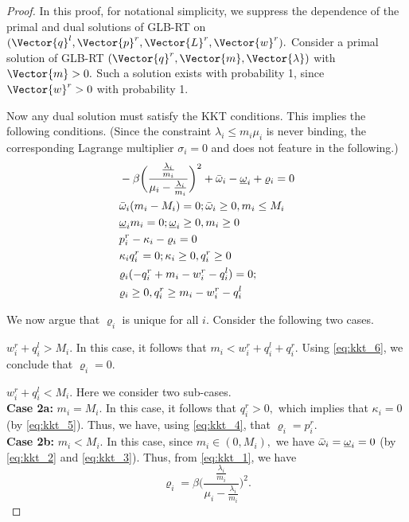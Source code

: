 \begin{proof}
  In this proof, for notational simplicity, we suppress the dependence
  of the primal and dual solutions of GLB-RT on
  $(\Vector{q}^l,\Vector{p}^r,\Vector{L}^r,\Vector{w}^r).$ Consider a
  primal solution of GLB-RT
  $(\Vector{q}^r,\Vector{m},\Vector{\lambda})$ with $\Vector{m} > 0.$
  Such a solution exists with probability 1, since $\Vector{w}^r > 0$
  with probability 1.

  Now any dual solution must satisfy the KKT conditions. This implies
  the following conditions. (Since the constraint $\lambda_i \leq m_i
  \mu_i$ is never binding, the corresponding Lagrange multiplier
  $\sigma_i = 0$ and does not feature in the following.)
\begin{align}
  \label{eq:kkt_1}
  &- \beta \bigg (\frac{\frac{\lambda_i}{m_i}}{\mu_i - \frac{\lambda_i}{m_i}}\bigg)^2 + \bar{\omega}_i - \underbar{$\omega$}_i + \varrho_i = 0 \\
  \label{eq:kkt_2}
  &\bar{\omega}_i(m_i - M_i) = 0; \bar{\omega}_i \geq 0, m_i \leq M_i \\
  \label{eq:kkt_3}
  &\underbar{$\omega$}_i m_i = 0; \underbar{$\omega$}_i \geq 0, m_i \geq 0 \\
  \label{eq:kkt_4}
  &p_i^r - \kappa_i - \varrho_i = 0 \\
  \label{eq:kkt_5}
  &\kappa_i q^r_i = 0; \kappa_i \geq 0, q^r_i \geq 0 \\
  \label{eq:kkt_6}
  &\varrho_i(-q^r_i + m_i - w^r_i - q^l_i)  = 0; \\
  \label{eq:kkt_7}
  &\varrho_i \geq 0, q^r_i \geq m_i - w^r_i - q^l_i
\end{align}

We now argue that $\varrho_i$ is unique for all $i.$ Consider the
following two cases.

 $w^r_i + q^l_i > M_i.$ In this case, it
follows that $m_i <w^r_i + q^l_i + q^r_i.$ Using \eqref{eq:kkt_6}, we
conclude that $\varrho_i = 0.$

 $w^r_i + q^l_i < M_i.$ Here we consider two
sub-cases. \\
{\bf Case 2a:} $m_i = M_i.$ In this case, it follows that $q^r_i > 0,$
which implies that $\kappa_i = 0$ (by \eqref{eq:kkt_5}). Thus, we
have, using \eqref{eq:kkt_4}, that $\varrho_i = p^r_i.$\\
{\bf Case 2b:} $m_i < M_i.$ In this case, since $m_i \in (0,M_i),$ we
have $\bar{\omega}_i = \underbar{$\omega$}_i = 0$ 
(by \eqref{eq:kkt_2}
and \eqref{eq:kkt_3}). Thus, from \eqref{eq:kkt_1}, we
have $$\varrho_i = \beta \bigg (\frac{\frac{\lambda_i}{m_i}}{\mu_i -
  \frac{\lambda_i}{m_i}}\bigg)^2.$$


\end{proof}
